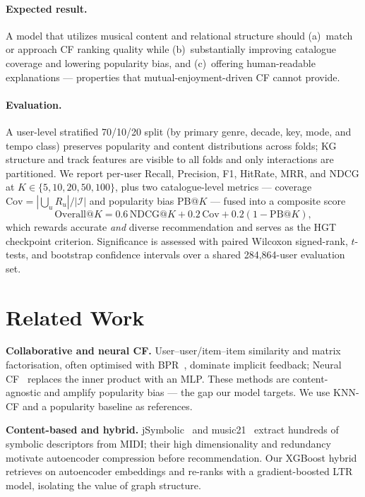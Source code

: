 \documentclass[10pt,twocolumn,letterpaper]{article}
\begin{document}
\paragraph{Expected result.} A model that utilizes musical content and relational
structure should (a)~match or approach CF ranking quality while (b)~substantially
improving catalogue coverage and lowering popularity bias, and (c)~offering
human-readable explanations --- properties that mutual-enjoyment-driven CF cannot
provide.

\paragraph{Evaluation.} A user-level stratified 70/10/20 split (by primary genre,
decade, key, mode, and tempo class) preserves popularity and content distributions
across folds; KG structure and track features are visible to all folds and only
interactions are partitioned. We report per-user Recall, Precision, F1, HitRate, MRR, and NDCG at
$K\in\{5,10,20,50,100\}$, plus two catalogue-level metrics --- coverage
$\mathrm{Cov}=|\bigcup_u R_u|/|\mathcal{I}|$ and popularity bias PB@$K$ --- fused
into a composite score
\begin{equation}\label{eq:overall}
  \mathrm{Overall@}K = 0.6\,\mathrm{NDCG@}K + 0.2\,\mathrm{Cov} + 0.2(1-\mathrm{PB@}K),
\end{equation}
which rewards accurate \emph{and} diverse recommendation and serves as the HGT
checkpoint criterion. Significance is assessed with paired Wilcoxon signed-rank,
$t$-tests, and bootstrap confidence intervals over a shared 284{,}864-user
evaluation set.

\section{Related Work}
\label{sec:related}

\textbf{Collaborative and neural CF.} User--user/item--item similarity and matrix
factorisation, often optimised with BPR~\cite{rendle2009bpr}, dominate implicit
feedback; Neural CF~\cite{he2017ncf} replaces the inner product with an MLP. These
methods are content-agnostic and amplify popularity bias --- the gap our model
targets. We use KNN-CF and a popularity baseline as references.

\textbf{Content-based and hybrid.} jSymbolic~\cite{mckay2018jsymbolic} and
music21~\cite{music21docs} extract hundreds of symbolic descriptors from MIDI;
their high dimensionality and redundancy motivate autoencoder compression before
recommendation. Our XGBoost hybrid retrieves on autoencoder embeddings and
re-ranks with a gradient-boosted LTR model, isolating the value of graph structure.
\end{document}
